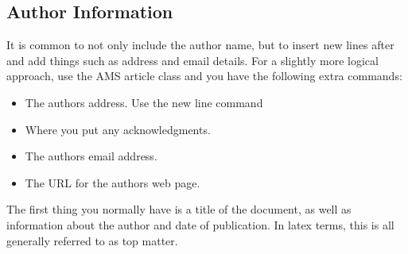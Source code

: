 	\subsection{Author Information}

	It is common to not only include the author name, but to insert new
	lines after and add things such
	as address and email details.  For a slightly more logical approach, use
	the AMS article class and you have the following extra
	commands:

	\begin{itemize}
		\item  The authors address.  Use
		the new line command
		\item Where you put any acknowledgments.
		\item The authors email address.
		\item The URL for the authors web page.
	\end{itemize}

	The first thing you normally have is a title of the document, as well as
	information about the author and date of publication. In latex terms,
	this is all generally referred to as top matter.

